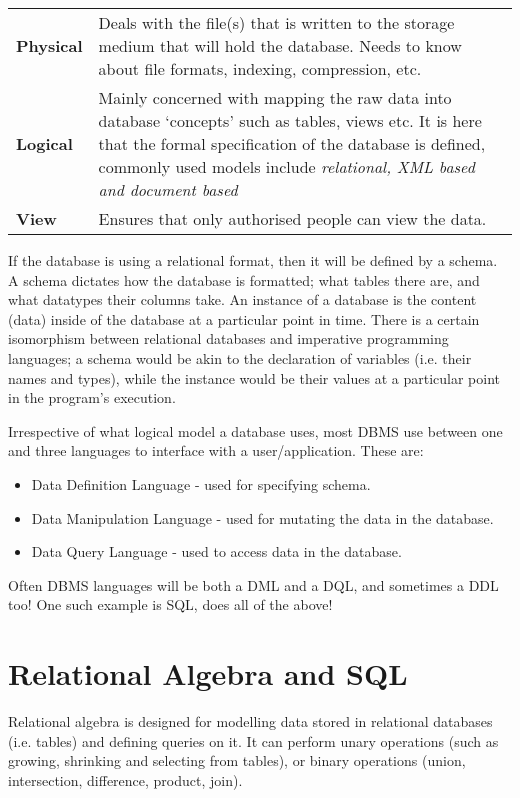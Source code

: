\begin{tabularx}{\textwidth}{>{\bfseries}l X}
  Physical & Deals with the file(s) that is written to the
             storage medium that will hold the database. Needs to know about
             file formats, indexing, compression, etc.\\
  Logical  & Mainly concerned with mapping the raw data into database
             `concepts' such as tables, views etc. It is here that the formal
             specification of the database is defined, commonly used models
             include \textit{relational, XML based and document based}\\
  View     & Ensures that only authorised people can view the data.\\
\end{tabularx}

If the database is using a relational format, then it will be defined by a
schema. A schema dictates how the database is formatted; what tables there are,
and what datatypes their columns take. An instance of a database is the content
(data) inside of the database at a particular point in time. There is a certain
isomorphism between relational databases and imperative programming languages; a
schema would be akin to the declaration of variables (i.e. their names and
types), while the instance would be their values at a particular point in the
program's execution.

Irrespective of what logical model a database uses, most DBMS use between one
and three languages to interface with a user/application. These are:

\begin{itemize}
  \item Data Definition Language - used for specifying schema.
  \item Data Manipulation Language - used for mutating the data in the database.
  \item Data Query Language - used to access data in the database.
\end{itemize}

Often DBMS languages will be both a DML and a DQL, and sometimes a DDL too! One
such example is SQL, does all of the above!

\section{Relational Algebra and SQL}

Relational algebra is designed for modelling data stored in relational databases
(i.e. tables) and defining queries on it. It can perform unary operations (such
as growing, shrinking and selecting from tables), or binary operations (union,
intersection, difference, product, join).

